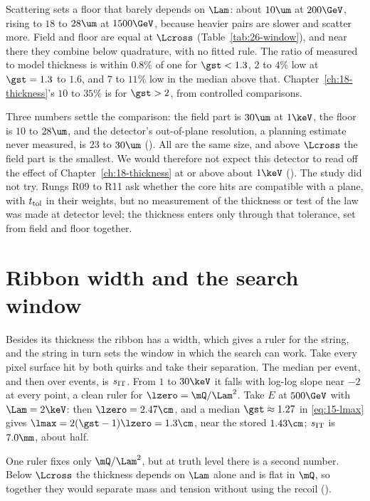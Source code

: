 Scattering sets a floor that barely depends on $\Lam$: about $10\um$ at $200\GeV$, rising to $18$ to $28\um$
at $1500\GeV$, because heavier pairs are slower and scatter more. Field and floor are equal at $\Lcross$ (Table~\ref{tab:26-window}), and near there they combine below quadrature, with no fitted rule. The ratio of measured to model thickness is within $0.8\%$ of one for $\gst<1.3$, $2$ to $4\%$ low at $\gst=1.3$ to $1.6$, and $7$ to $11\%$ low in the median above that. Chapter~\ref{ch:18-thickness}'s $10$ to $35\%$ is for $\gst>2$, from controlled comparisons.

Three numbers settle the comparison: the field part is $30\um$ at $1\keV$, the floor is $10$ to $28\um$, and the detector's out-of-plane resolution, a planning estimate never measured,
is $23$ to $30\um$ (\EST). All are the same size, and above $\Lcross$ the field part is the smallest. We would therefore not expect this detector to read off the effect of
Chapter~\ref{ch:18-thickness} at or above about $1\keV$ (\EST). The study did not try. Rungs R09 to R11 ask whether the core hits are compatible with a plane, with $t_{\rm tol}$ in their weights, but no measurement of the thickness or test of the law was made at detector level; the thickness enters only through that tolerance, set from field and floor together.

\section{Ribbon width and the search window}\label{sec:26-handles}

Besides its thickness the ribbon has a width, which gives a ruler for the string, and the string in turn sets the window in which the search can work. Take every pixel surface hit by both quirks and take their separation. The median
per event, and then over events, is $s_{\rm IT}$. From $1$ to $30\keV$ it falls with log-log slope near $-2$ at
every point, a clean ruler for $\lzero=\mQ/\Lam^2$. Take $E$ at $500\GeV$ with $\Lam=2\keV$: then $\lzero=2.47\cm$, and a median $\gst\approx1.27$ in
\eqref{eq:15-lmax} gives $\lmax=2(\gst-1)\lzero=1.3\cm$, near the stored $1.43\cm$; $s_{\rm IT}$ is $7.0\mm$, about half.

One ruler fixes only $\mQ/\Lam^2$, but at truth level there is a second number. Below $\Lcross$ the thickness depends on
$\Lam$ alone and is flat in $\mQ$, so together they would separate mass and tension without using the recoil (\EST).


